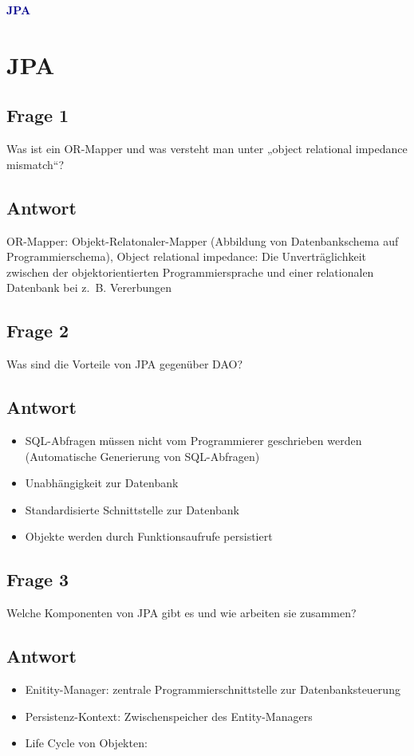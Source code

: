 \textbf{\textcolor{darkblue}{ JPA}}~

\section*{JPA}
\subsection*{Frage 1}
Was ist ein OR-Mapper und was versteht man unter „object relational impedance mismatch“?
\subsection*{Antwort}
OR-Mapper: Objekt-Relatonaler-Mapper (Abbildung von Datenbankschema auf Programmierschema),
Object relational impedance: Die Unverträglichkeit zwischen der objektorientierten Programmiersprache und einer relationalen Datenbank bei z. B. Vererbungen 
\subsection*{Frage 2}
Was sind die Vorteile von JPA gegenüber DAO?
\subsection*{Antwort}
\begin{itemize}
	\item SQL-Abfragen müssen nicht vom Programmierer geschrieben werden (Automatische Generierung von SQL-Abfragen)
	\item Unabhängigkeit zur Datenbank
	\item Standardisierte Schnittstelle zur Datenbank
	\item Objekte werden durch Funktionsaufrufe persistiert
\end{itemize}

\subsection*{Frage 3}
Welche Komponenten von JPA gibt es und wie arbeiten sie zusammen?
\subsection*{Antwort}
\begin{itemize}
	\item Enitity-Manager: zentrale Programmierschnittstelle zur Datenbanksteuerung
	\item Persistenz-Kontext: Zwischenspeicher des Entity-Managers
	\item Life Cycle von Objekten:
\end{itemize}
